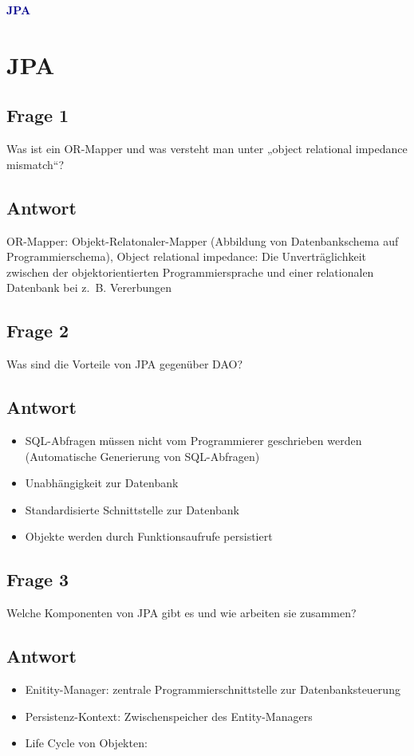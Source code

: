 \textbf{\textcolor{darkblue}{ JPA}}~

\section*{JPA}
\subsection*{Frage 1}
Was ist ein OR-Mapper und was versteht man unter „object relational impedance mismatch“?
\subsection*{Antwort}
OR-Mapper: Objekt-Relatonaler-Mapper (Abbildung von Datenbankschema auf Programmierschema),
Object relational impedance: Die Unverträglichkeit zwischen der objektorientierten Programmiersprache und einer relationalen Datenbank bei z. B. Vererbungen 
\subsection*{Frage 2}
Was sind die Vorteile von JPA gegenüber DAO?
\subsection*{Antwort}
\begin{itemize}
	\item SQL-Abfragen müssen nicht vom Programmierer geschrieben werden (Automatische Generierung von SQL-Abfragen)
	\item Unabhängigkeit zur Datenbank
	\item Standardisierte Schnittstelle zur Datenbank
	\item Objekte werden durch Funktionsaufrufe persistiert
\end{itemize}

\subsection*{Frage 3}
Welche Komponenten von JPA gibt es und wie arbeiten sie zusammen?
\subsection*{Antwort}
\begin{itemize}
	\item Enitity-Manager: zentrale Programmierschnittstelle zur Datenbanksteuerung
	\item Persistenz-Kontext: Zwischenspeicher des Entity-Managers
	\item Life Cycle von Objekten:
\end{itemize}
